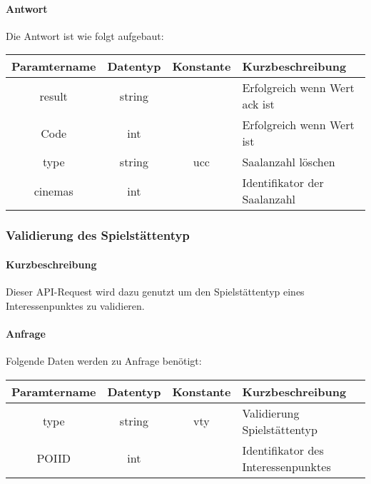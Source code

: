 \paragraph{Antwort}Die Antwort ist wie folgt aufgebaut:
\begin{table}[H]
	\begin{tabular}{|c|c|c|p{6.5cm}|}
		\hline
		\textbf{Paramtername} & \textbf{Datentyp} & \textbf{Konstante} & \textbf{Kurzbeschreibung}                                                                                               \\ \hline
		result              & string           &                 & Erfolgreich wenn Wert {\glqq ack\grqq} ist \\ \hline
		Code                & int              &                 & Erfolgreich wenn Wert {\glqq 0\grqq} ist \\ \hline
		type                & string           & ucc             & Saalanzahl löschen \\ \hline
		cinemas             & int              &                 & Identifikator der Saalanzahl \\ \hline
	\end{tabular}
\end{table}

\subsubsection{Validierung des Spielstättentyp}
\paragraph{Kurzbeschreibung}Dieser API-Request wird dazu genutzt um den Spielstättentyp eines Interessenpunktes zu validieren.
\paragraph{Anfrage}Folgende Daten werden zu Anfrage benötigt:
\begin{table}[H]
	\begin{tabular}{|c|c|c|p{6.5cm}|}
		\hline
		\textbf{Paramtername} & \textbf{Datentyp} & \textbf{Konstante} & \textbf{Kurzbeschreibung}                                                                                               \\ \hline
		type                & string            & vty                & Validierung Spielstättentyp \\ \hline
		POIID               & int               &                    & Identifikator des Interessenpunktes \\ \hline
	\end{tabular}
\end{table}
